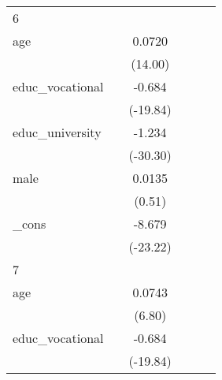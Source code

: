 {\begin{tabular}{l*{5}{c}}
\hline
6           &                     &                     &                     &                     &                     \\
age         &                     &      0.0720\sym{***}&                     &                     &                     \\
            &                     &     (14.00)         &                     &                     &                     \\
[1em]
educ\_vocational&                     &      -0.684\sym{***}&                     &                     &                     \\
            &                     &    (-19.84)         &                     &                     &                     \\
[1em]
educ\_university&                     &      -1.234\sym{***}&                     &                     &                     \\
            &                     &    (-30.30)         &                     &                     &                     \\
[1em]
male        &                     &      0.0135         &                     &                     &                     \\
            &                     &      (0.51)         &                     &                     &                     \\
[1em]
\_cons      &                     &      -8.679\sym{***}&                     &                     &                     \\
            &                     &    (-23.22)         &                     &                     &                     \\
\hline
7           &                     &                     &                     &                     &                     \\
age         &                     &      0.0743\sym{***}&                     &                     &                     \\
            &                     &      (6.80)         &                     &                     &                     \\
[1em]
educ\_vocational&                     &      -0.684\sym{***}&                     &                     &                     \\
            &                     &    (-19.84)         &                     &                     &                     \\

\end{tabular}}
